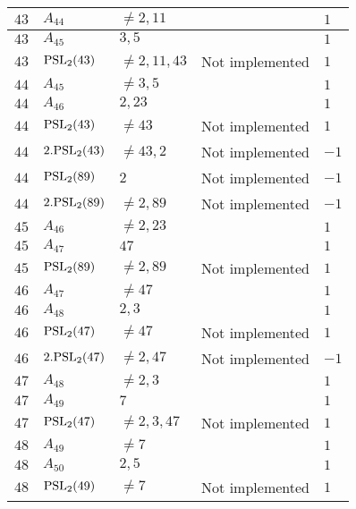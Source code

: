 \documentclass[a4paper, 11pt]{article}
\begin{document}
\begin{longtable}{lllll}
        $ 43 $ & $ A_{44} $ & $ \neq 2, 11 $ & $ ~ $ & $ 1  $ \\ \hline
        $ 43 $ & $ A_{45} $ & $ 3, 5 $ & $ ~ $ & $ 1  $ \\ \hline
        $ 43 $ & $ {\rm PSL}_{2}(43) $ & $ \neq 2, 11, 43 $ & Not implemented & $ 1  $ \\ \hline
        $ 44 $ & $ A_{45} $ & $ \neq 3, 5 $ & $ ~ $ & $ 1  $ \\ \hline
        $ 44 $ & $ A_{46} $ & $ 2, 23 $ & $ ~ $ & $ 1  $ \\ \hline
        $ 44 $ & $ {\rm PSL}_{2}(43) $ & $ \neq 43 $ & Not implemented & $ 1  $ \\ \hline
        $ 44 $ & $ 2.{\rm PSL}_{2}(43) $ & $ \neq 43, 2 $ & Not implemented & $ -1  $ \\ \hline
        $ 44 $ & $ {\rm PSL}_{2}(89) $ & $ 2 $ & Not implemented & $ -1  $ \\ \hline
        $ 44 $ & $ 2.{\rm PSL}_{2}(89) $ & $ \neq 2, 89 $ & Not implemented & $ -1  $ \\ \hline
        $ 45 $ & $ A_{46} $ & $ \neq 2, 23 $ & $ ~ $ & $ 1  $ \\ \hline
        $ 45 $ & $ A_{47} $ & $ 47 $ & $ ~ $ & $ 1  $ \\ \hline
        $ 45 $ & $ {\rm PSL}_{2}(89) $ & $ \neq 2, 89 $ & Not implemented & $ 1  $ \\ \hline
        $ 46 $ & $ A_{47} $ & $ \neq 47 $ & $ ~ $ & $ 1  $ \\ \hline
        $ 46 $ & $ A_{48} $ & $ 2, 3 $ & $ ~ $ & $ 1  $ \\ \hline
        $ 46 $ & $ {\rm PSL}_{2}(47) $ & $ \neq 47 $ & Not implemented & $ 1  $ \\ \hline
        $ 46 $ & $ 2.{\rm PSL}_{2}(47) $ & $ \neq 2, 47 $ & Not implemented & $ -1  $ \\ \hline
        $ 47 $ & $ A_{48} $ & $ \neq 2, 3 $ & $ ~ $ & $ 1  $ \\ \hline
        $ 47 $ & $ A_{49} $ & $ 7 $ & $ ~ $ & $ 1  $ \\ \hline
        $ 47 $ & $ {\rm PSL}_{2}(47) $ & $ \neq 2, 3, 47 $ & Not implemented & $ 1  $ \\ \hline
        $ 48 $ & $ A_{49} $ & $ \neq 7 $ & $ ~ $ & $ 1  $ \\ \hline
        $ 48 $ & $ A_{50} $ & $ 2, 5 $ & $ ~ $ & $ 1  $ \\ \hline
        $ 48 $ & $ {\rm PSL}_{2}(49) $ & $ \neq 7 $ & Not implemented & $ 1  $ \\ \hline

\end{longtable}
\end{document}
